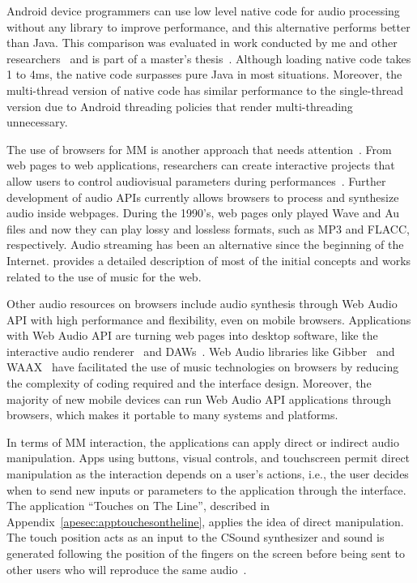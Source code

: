 Android device programmers can use low level native code for audio processing without any library to improve performance, and this alternative performs better than Java.
This comparison was evaluated in work conducted by me and other researchers~\citep{deCarvalhoJunior2013fftbenchmark} and is part of a master's  thesis~\citep{bianchi2014processamento}.
Although loading native code takes 1 to 4ms, the native code surpasses pure Java in most situations.
Moreover, the multi-thread version of native code has similar performance to the single-thread version due to Android threading policies that render multi-threading unnecessary.

The use of browsers for MM is another approach that needs attention~\citep{Wyse2013viability}.
From web pages to web applications, researchers  can create interactive projects that allow users to control audiovisual parameters during performances~\citep{Allison2013nexus,Weitzner2012massmobile}.
Further development of audio APIs currently allows browsers to process and synthesize audio inside webpages.
During the 1990's, web pages only played Wave and Au files and now they can play lossy and lossless formats, such as MP3 and FLACC, respectively.
Audio streaming has been an alternative since the beginning of the Internet.
\cite{Duckworth2005virtual} provides a detailed description of most of the initial concepts and works related to the use of music for the web.

Other audio resources on browsers include audio synthesis through Web Audio API with high performance and flexibility, even on mobile browsers.
Applications with Web Audio API are turning web pages into desktop software, like the interactive audio renderer~\citep{Matuszewski2016interactive} and DAWs~\citep{Kleimola2015daw}.
Web Audio libraries like Gibber~\citep{Roberts2012gibberlivecoding} and WAAX~\citep{Choi2013waax} have facilitated the use of music technologies on browsers by reducing the complexity of coding required and the interface design.
Moreover, the majority of new mobile devices can run Web Audio API applications through browsers, which makes it portable to many systems and platforms.

In terms of MM interaction, the applications can apply direct or indirect audio manipulation.
Apps using buttons, visual controls, and touchscreen permit direct manipulation as the interaction depends on a user's actions, i.e., the user decides when to send new inputs or parameters to the application through the interface.
The application ``Touches on The Line'', described in Appendix~\ref{apesec:apptouchesontheline}, applies the idea of direct manipulation.
The touch position acts as an input to the CSound synthesizer and sound is generated following the position of the fingers on the screen before being sent to other users who will reproduce the same audio~\citep{deCarvalhoJunior2013touches}.

